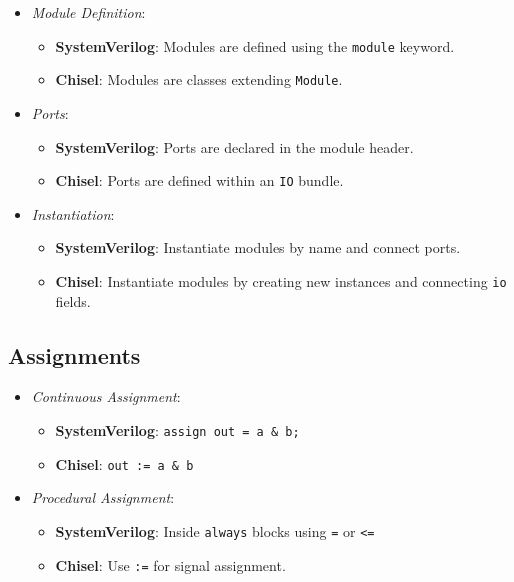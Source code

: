 \begin{itemize}
    \item \textit{Module Definition}:
        \begin{itemize}
            \item \textbf{SystemVerilog}: Modules are defined using the \texttt{module} keyword.
            \item \textbf{Chisel}: Modules are classes extending \texttt{Module}.
        \end{itemize}
    \item \textit{Ports}:
        \begin{itemize}
            \item \textbf{SystemVerilog}: Ports are declared in the module header.
            \item \textbf{Chisel}: Ports are defined within an \texttt{IO} bundle.
        \end{itemize}
    \item \textit{Instantiation}:
        \begin{itemize}
            \item \textbf{SystemVerilog}: Instantiate modules by name and connect ports.
            \item \textbf{Chisel}: Instantiate modules by creating new instances and connecting \texttt{io} fields.
        \end{itemize}
\end{itemize}

\subsection{Assignments}

\begin{itemize}
    \item \textit{Continuous Assignment}:
        \begin{itemize}
            \item \textbf{SystemVerilog}: \texttt{assign out = a \& b;}
            \item \textbf{Chisel}: \texttt{out := a \& b}
        \end{itemize}
    \item \textit{Procedural Assignment}:
        \begin{itemize}
            \item \textbf{SystemVerilog}: Inside \texttt{always} blocks using \texttt{=} or \texttt{<=}
            \item \textbf{Chisel}: Use \texttt{:=} for signal assignment.
        \end{itemize}
\end{itemize}

